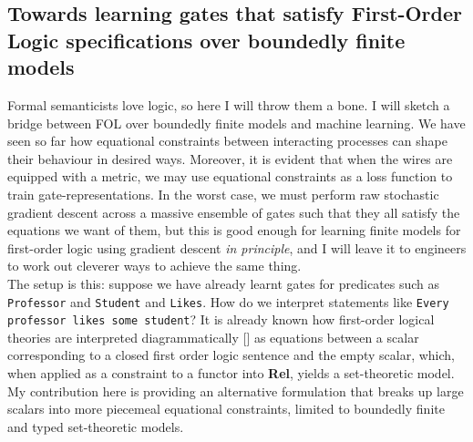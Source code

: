 \begin{fullwidth}

\section{Towards learning gates that satisfy First-Order Logic specifications over boundedly finite models}

Formal semanticists love logic, so here I will throw them a bone. I will sketch a bridge between FOL over boundedly finite models and machine learning. We have seen so far how equational constraints between interacting processes can shape their behaviour in desired ways. Moreover, it is evident that when the wires are equipped with a metric, we may use equational constraints as a loss function to train gate-representations. In the worst case, we must perform raw stochastic gradient descent across a massive ensemble of gates such that they all satisfy the equations we want of them, but this is good enough for learning finite models for first-order logic using gradient descent \emph{in principle}, and I will leave it to engineers to work out cleverer ways to achieve the same thing.\\

The setup is this: suppose we have already learnt gates for predicates such as \texttt{Professor} and \texttt{Student} and \texttt{Likes}. How do we interpret statements like \texttt{Every professor likes some student}? It is already known how first-order logical theories are interpreted diagrammatically [] as equations between a scalar corresponding to a closed first order logic sentence and the empty scalar, which, when applied as a constraint to a functor into \textbf{Rel}, yields a set-theoretic model. My contribution here is providing an alternative formulation that breaks up large scalars into more piecemeal equational constraints, limited to boundedly finite and typed set-theoretic models.\\


\end{fullwidth}
